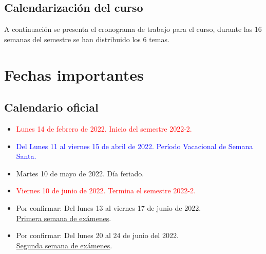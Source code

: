\subsection{Calendarización del curso}

A continuación se presenta el cronograma de trabajo para el curso, durante las 16 semanas del semestre se han distribuido los 6 temas.

{

}

\section{Fechas importantes}

\subsection{Calendario oficial}

\begin{itemize}
\item \textcolor{red}{Lunes 14 de febrero de 2022. Inicio del semestre 2022-2.}
\item \textcolor{blue}{Del Lunes 11 al viernes 15 de abril de 2022. Período Vacacional de Semana Santa.}
\item Martes 10 de mayo de 2022. Día feriado.
\item \textcolor{red}{Viernes 10 de junio de 2022. Termina el semestre 2022-2.}
\item Por confirmar: Del lunes 13 al viernes 17 de junio de 2022. \\ \underline{Primera semana de exámenes}.
\item Por confirmar: Del lunes 20 al 24 de junio del 2022. \\ \underline{Segunda semana de exámenes}.
\end{itemize}

